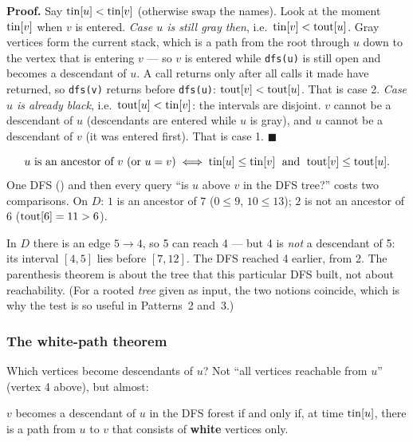 \textbf{Proof.} Say $\mathrm{tin}[u] < \mathrm{tin}[v]$ (otherwise swap the names). Look at the moment $\mathrm{tin}[v]$ when $v$ is entered.
\emph{Case $u$ is still gray then}, i.e.\ $\mathrm{tin}[v] < \mathrm{tout}[u]$. Gray vertices form the current stack, which is a path from the root through $u$ down to the vertex that is entering $v$ --- so $v$ is entered while \texttt{dfs(u)} is still open and becomes a descendant of $u$. A call returns only after all calls it made have returned, so \texttt{dfs(v)} returns before \texttt{dfs(u)}: $\mathrm{tout}[v] < \mathrm{tout}[u]$. That is case 2.
\emph{Case $u$ is already black}, i.e.\ $\mathrm{tout}[u] < \mathrm{tin}[v]$: the intervals are disjoint. $v$ cannot be a descendant of $u$ (descendants are entered while $u$ is gray), and $u$ cannot be a descendant of $v$ (it was entered first). That is case 1. \hfill$\blacksquare$

\begin{insightbox}
\[
    u \text{ is an ancestor of } v \text{ (or } u = v) \iff \mathrm{tin}[u] \le \mathrm{tin}[v] \;\text{ and }\; \mathrm{tout}[v] \le \mathrm{tout}[u].
\]
One DFS (\VE) and then every query ``is $u$ above $v$ in the DFS tree?'' costs two comparisons. On $D$: $1$ is an ancestor of $7$ ($0 \le 9$, $10 \le 13$); $2$ is not an ancestor of $6$ ($\mathrm{tout}[6] = 11 > 6$).
\end{insightbox}

\begin{warningbox}
In $D$ there is an edge $5 \to 4$, so 5 can reach 4 --- but 4 is \emph{not} a descendant of 5: its interval $[4,5]$ lies before $[7,12]$. The DFS reached 4 earlier, from 2. The parenthesis theorem is about the tree that this particular DFS built, not about reachability. (For a rooted \emph{tree} given as input, the two notions coincide, which is why the test is so useful in Patterns~2 and~3.)
\end{warningbox}

\subsubsection*{The white-path theorem}

Which vertices become descendants of $u$? Not ``all vertices reachable from $u$'' (vertex 4 above), but almost:

\begin{theorembox}
$v$ becomes a descendant of $u$ in the DFS forest if and only if, at time $\mathrm{tin}[u]$, there is a path from $u$ to $v$ that consists of \textbf{white} vertices only.
\end{theorembox}


